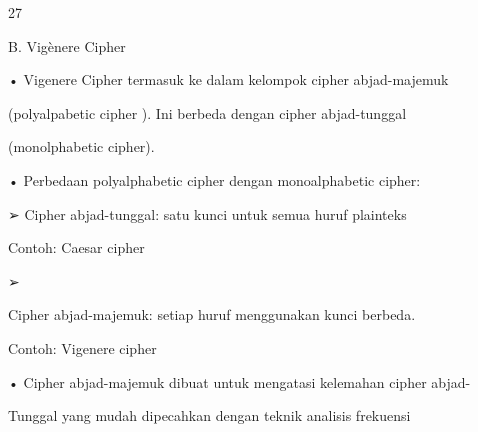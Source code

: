\documentclass{article}
\begin{document}

27

B. Vigènere Cipher 

• Vigenere Cipher termasuk ke dalam kelompok cipher abjad-majemuk 

(polyalpabetic cipher ). Ini berbeda dengan cipher abjad-tunggal 

(monolphabetic cipher).

• Perbedaan polyalphabetic cipher dengan monoalphabetic cipher:

➢  Cipher abjad-tunggal: satu kunci untuk semua huruf plainteks 

       Contoh: Caesar cipher

➢

Cipher abjad-majemuk: setiap huruf menggunakan  kunci berbeda. 

       Contoh: Vigenere cipher

• Cipher abjad-majemuk dibuat untuk mengatasi kelemahan cipher abjad-

Tunggal yang mudah dipecahkan dengan teknik analisis frekuensi
\end{document}
